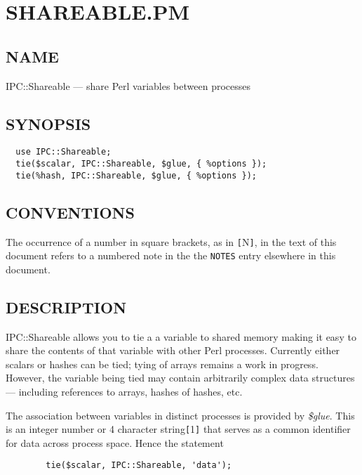
\section{SHAREABLE.PM}%

\subsection*{NAME}
IPC::Shareable --- share Perl variables between processes

\subsection*{SYNOPSIS}\begin{verbatim}
  use IPC::Shareable;
  tie($scalar, IPC::Shareable, $glue, { %options });
  tie(%hash, IPC::Shareable, $glue, { %options });
\end{verbatim}

\subsection*{CONVENTIONS}%

The occurrence of a number in square brackets, as in {\tt [}N{\tt ]}, in the text
of this document refers to a numbered note in the the {\tt NOTES} entry elsewhere in this document.

\subsection*{DESCRIPTION}
IPC::Shareable allows you to tie a a variable to shared memory making
it easy to share the contents of that variable with other Perl
processes.  Currently either scalars or hashes can be tied; tying of
arrays remains a work in progress.  However, the variable being tied
may contain arbitrarily complex data structures --- including references
to arrays, hashes of hashes, etc.

The association between variables in distinct processes is provided by
{\em \$glue\/}.  This is an integer number or 4 character string{\tt [}1{\tt ]} that serves
as a common identifier for data across process space.  Hence the
statement
\begin{verbatim}
        tie($scalar, IPC::Shareable, 'data');
\end{verbatim}

